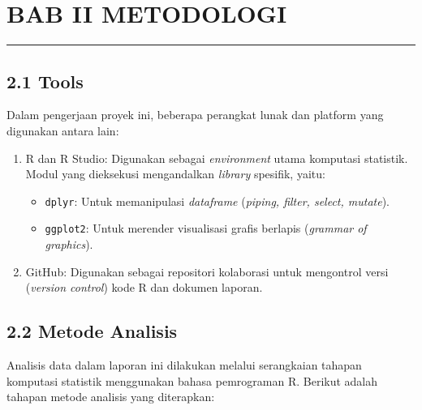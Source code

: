 \documentclass[
]{article}
\providecommand{\tightlist}{%
  \setlength{\itemsep}{0pt}\setlength{\parskip}{0pt}}
\begin{document}
\section{BAB II METODOLOGI}\label{bab-ii-metodologi}

\begin{center}\rule{0.5\linewidth}{0.5pt}\end{center}

\subsection{2.1 Tools}\label{tools}

Dalam pengerjaan proyek ini, beberapa perangkat lunak dan platform yang
digunakan antara lain:

\begin{enumerate}
\def\labelenumi{\arabic{enumi}.}
\tightlist
\item
  R dan R Studio: Digunakan sebagai \emph{environment} utama komputasi
  statistik. Modul yang dieksekusi mengandalkan \emph{library} spesifik,
  yaitu:

  \begin{itemize}
  \tightlist
  \item
    \texttt{dplyr}: Untuk memanipulasi \emph{dataframe} (\emph{piping,
    filter, select, mutate}).
  \item
    \texttt{ggplot2}: Untuk merender visualisasi grafis berlapis
    (\emph{grammar of graphics}).
  \end{itemize}
\item
  GitHub: Digunakan sebagai repositori kolaborasi untuk mengontrol versi
  (\emph{version control}) kode R dan dokumen laporan.
\end{enumerate}

\subsection{2.2 Metode Analisis}\label{metode-analisis}

Analisis data dalam laporan ini dilakukan melalui serangkaian tahapan
komputasi statistik menggunakan bahasa pemrograman R. Berikut adalah
tahapan metode analisis yang diterapkan:
\end{document}

